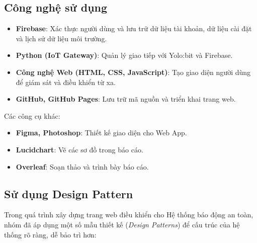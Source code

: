 \subsection{Công nghệ sử dụng}
\begin{itemize}
    \item \textbf{Firebase}: Xác thực người dùng và lưu trữ dữ liệu tài khoản, dữ liệu cài đặt và lịch sử dữ liệu môi trường.
    \item \textbf{Python (IoT Gateway)}: Quản lý giao tiếp với Yolo:bit và Firebase.
    \item \textbf{Công nghệ Web (HTML, CSS, JavaScript)}: Tạo giao diện người dùng để giám sát và điều khiển từ xa.
    \item \textbf{GitHub, GitHub Pages}: Lưu trữ mã nguồn và triển khai trang web.
\end{itemize}

Các công cụ khác:

\begin{itemize}
    \item \textbf{Figma, Photoshop}: Thiết kế giao diện cho Web App.
    \item \textbf{Lucidchart}: Vẽ các sơ đồ trong báo cáo.
    \item \textbf{Overleaf}: Soạn thảo và trình bày báo cáo.
\end{itemize}

\subsection{Sử dụng Design Pattern}

Trong quá trình xây dựng trang web điều khiển cho Hệ thống báo động an toàn, nhóm đã áp dụng một số mẫu thiết kế (\textit{Design Patterns}) để cấu trúc của hệ thống rõ ràng, dễ bảo trì hơn:

